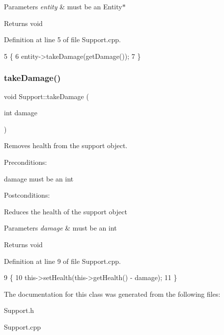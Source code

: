 \begin{DoxyParams}{Parameters}
{\em entity} & must be an Entity$\ast$ \\
\hline
\end{DoxyParams}
\begin{DoxyReturn}{Returns}
void 
\end{DoxyReturn}


Definition at line 5 of file Support.\+cpp.


\begin{DoxyCode}
5                                        \{
6     entity->takeDamage(getDamage());
7 \}
\end{DoxyCode}
\mbox{\label{classSupport_afb159bd8c474ec67ad5d03fa24c38564}} 
\subsubsection{\texorpdfstring{take\+Damage()}{takeDamage()}}
{\footnotesize\ttfamily void Support\+::take\+Damage (\begin{DoxyParamCaption}\item[{int}]{damage }\end{DoxyParamCaption})}



Removes health from the support object. 

Preconditions\+:
\begin{DoxyItemize}
\item damage must be an int
\end{DoxyItemize}

Postconditions\+:
\begin{DoxyItemize}
\item Reduces the health of the support object
\end{DoxyItemize}


\begin{DoxyParams}{Parameters}
{\em damage} & must be an int \\
\hline
\end{DoxyParams}
\begin{DoxyReturn}{Returns}
void 
\end{DoxyReturn}


Definition at line 9 of file Support.\+cpp.


\begin{DoxyCode}
9                                    \{
10     this->setHealth(this->getHealth() - damage);
11 \}
\end{DoxyCode}


The documentation for this class was generated from the following files\+:\begin{DoxyCompactItemize}
\item 
Support.\+h\item 
Support.\+cpp\end{DoxyCompactItemize}
